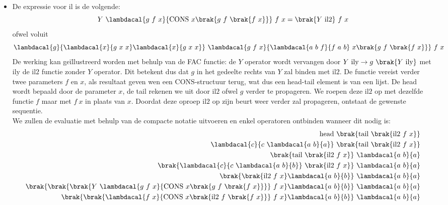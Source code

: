 \documentclass[fleqn]{article}
\newcommand{\cons}{\mbox{CONS}}
\begin{document}
\begin{answer}\hfill
\begin{itemize}
 \item De expressie voor $\mbox{il}$ is de volgende:
\begin{equation}
Y\ \lambdacal{g\ f\ x}{\cons\ x \brak{g\ f\ \brak{f\ x}}}\ f\ x = \brak{Y\ \mbox{il2}}\ f\ x
\end{equation} ofwel voluit
\begin{equation}
\lambdacal{g}{\lambdacal{x}{g\ x\ x}\lambdacal{x}{g\ x\ x}}\ \lambdacal{g\ f\ x}{\lambdacal{a\ b\ f}{f\ a\ b}\ x \brak{g\ f\ \brak{f\ x}}}\ f\ x
\end{equation}
De werking kan ge\"illustreerd worden met behulp van de \mbox{FAC} functie: de $Y$ operator wordt vervangen door $Y\ \mbox{ily}\rightarrow g\ \brak{Y\ \mbox{ily}}$ met $\mbox{ily}$ de $\mbox{il2}$ functie zonder $Y$ operator. Dit betekent dus dat $g$ in het gedeelte rechts van $Y$ zal binden met $\mbox{il2}$. De functie vereist verder twee parameters $f$ en $x$, als resultaat geven wen een $\mbox{CONS}$-structuur terug, wat dus een head-tail element is van een lijst. De head wordt bepaald door de parameter $x$, de tail rekenen we uit door $\mbox{il2}$ ofwel $g$ verder te propageren. We roepen deze $\mbox{il2}$ op met dezelfde functie $f$ maar met $f\ x$ in plaats van $x$. Doordat deze oproep $\mbox{il2}$ op zijn beurt weer verder zal propageren, ontstaat de gewenste sequentie.\\
We zullen de evaluatie met behulp van de compacte notatie uitvoeren en enkel operatoren ontbinden wanneer dit nodig is:
\begin{eqnarray}
\mbox{head}\ \brak{\mbox{tail}\ \brak{\mbox{il2}\ f\ x}}\hfill\\
\lambdacal{c}{c\ \lambdacal{a\ b}{a}}\ \brak{\mbox{tail}\ \brak{ \mbox{il2}\ f\ x }}\hfill\\
\brak{\mbox{tail}\ \brak{ \mbox{il2}\ f\ x }}\ \lambdacal{a\ b}{a}\hfill\\
\brak{\lambdacal{c}{c\ \lambdacal{a\ b}{b}}\ \brak{ \mbox{il2}\ f\ x }}\ \lambdacal{a\ b}{a}\hfill\\
\brak{\brak{ \mbox{il2}\ f\ x } \lambdacal{a\ b}{b}}\ \lambdacal{a\ b}{a}\hfill\\
\brak{\brak{ \brak{ Y\ \lambdacal{g\ f\ x}{\cons\ x \brak{g\ f\ \brak{f\ x}}} }\ f\ x } \lambdacal{a\ b}{b}}\ \lambdacal{a\ b}{a}\hfill\\
\brak{\brak{ \lambdacal{f\ x}{\cons\ x \brak{\mbox{il2}\ f\ \brak{f\ x}}}\ f\ x } \lambdacal{a\ b}{b}}\ \lambdacal{a\ b}{a}\hfill\\

\end{eqnarray}
\end{itemize}
\end{answer}
\end{document}
